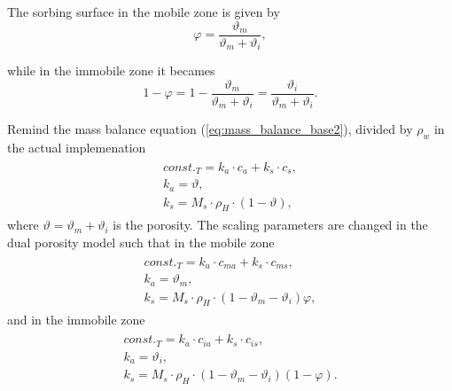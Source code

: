 The sorbing surface in the mobile zone is given by
\begin{equation}
  \varphi = \frac{\vartheta_m}{\vartheta_m + \vartheta_i}, 
\end{equation}

while in the immobile zone it becames
\[ 1 - \varphi = 1-\frac{\vartheta_m}{\vartheta_m + \vartheta_i} = \frac{\vartheta_i}{\vartheta_m + \vartheta_i}. \]

Remind the mass balance equation (\ref{eq:mass_balance_base2}), divided by $\rho_w$ in the actual implemenation
\begin{eqnarray}
 \begin{array}{l}
  const._T = k_a\cdot c_a + k_s\cdot c_s,\\
  k_a = \vartheta, \\
  k_s = M_s \cdot\rho_H\cdot(1-\vartheta),
 \end{array}
 \label{eq:scale_params}
\end{eqnarray}
where $\vartheta = \vartheta_m + \vartheta_i$ is the porosity.
The scaling parameters are changed in the dual porosity model such that in the mobile zone
\begin{eqnarray}
 \begin{array}{l}
  const._T = k_a\cdot c_{ma} + k_s\cdot c_{ms},\\
  k_a = \vartheta_m, \\
  k_s = M_s \cdot\rho_H\cdot(1-\vartheta_m - \vartheta_i)\varphi,
 \end{array}
 \label{eq:scale_params_m}
\end{eqnarray}
and in the immobile zone
\begin{eqnarray}
 \begin{array}{l}
  const._T = k_a\cdot c_{ia} + k_s\cdot c_{is},\\
  k_a = \vartheta_i, \\
  k_s = M_s \cdot\rho_H\cdot(1-\vartheta_m - \vartheta_i)(1 - \varphi).
 \end{array}
 \label{eq:scale_params_i}
\end{eqnarray}
